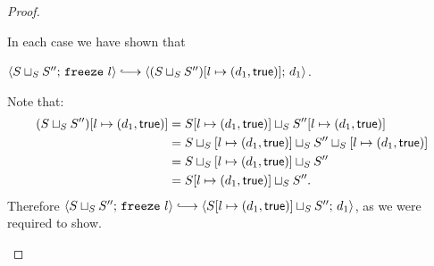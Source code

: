 \begin{proof}
\begin{itemize}
      In each case we have shown that

      $\config{\lubstore{S}{S''}}{\freeze{l}} \parstepsto
      \config{\extS{(\lubstore{S}{S''})}{l}{d_1}{\frozentrue}}{d_1}$.

      Note that:
      \begin{align*}
        (S \sqcup_{S} S'')[l \mapsto (d_1, \textsf{true})] &=
        S[l \mapsto (d_1, \textsf{true})] \sqcup_{S} S''[l \mapsto (d_1, \textsf{true})] \\
        &= S \sqcup_{S} \left[ l \mapsto (d_1, \textsf{true}) \right] \sqcup_{S} S'' \sqcup_{S} \left[ l \mapsto (d_1, \textsf{true}) \right] \\
        &= S \sqcup_{S} \left[ l \mapsto (d_1, \textsf{true}) \right] \sqcup_{S} S'' \\
        &= S[l \mapsto (d_1, \textsf{true})] \sqcup_{S} S''.
      \end{align*}
      Therefore
      $\config{\lubstore{S}{S''}}{\freeze{l}}
      \parstepsto
      \config{\lubstore{\extS{S}{l}{d_1}{\frozentrue}}{S''}}{d_1}$,
      as we were required to show.
  \end{itemize}
\end{proof}
